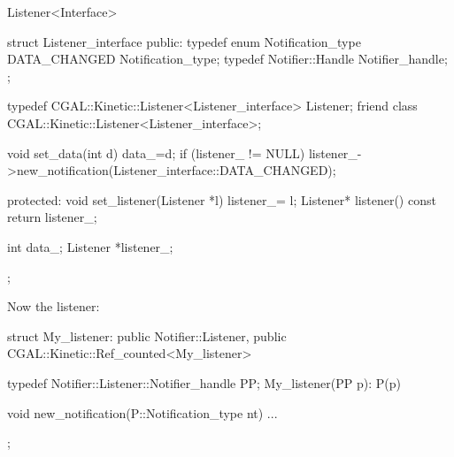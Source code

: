 \begin{ccRefClass}{Listener<Interface>}
\begin{ccExampleCode}
{  struct Listener_interface
  {
  public:
    typedef enum Notification_type {DATA_CHANGED} Notification_type;
    typedef Notifier::Handle Notifier_handle;
  };

  typedef CGAL::Kinetic::Listener<Listener_interface> Listener;
  friend class CGAL::Kinetic::Listener<Listener_interface>;
  
  void set_data(int d) {
    data_=d;
    if (listener_ != NULL) listener_->new_notification(Listener_interface::DATA_CHANGED);
  }

protected:
  void set_listener(Listener *l) {
    listener_= l;
  }
  Listener* listener() const {return listener_;}

  int data_;
  Listener *listener_;
};
\end{ccExampleCode}

Now the listener:
\begin{ccExampleCode}

struct My_listener: public Notifier::Listener, public CGAL::Kinetic::Ref_counted<My_listener>
{
  typedef Notifier::Listener::Notifier_handle PP;
  My_listener(PP p): P(p){}

  void new_notification(P::Notification_type nt) {
    ...
  }
};

\end{ccExampleCode}


\end{ccRefClass}


